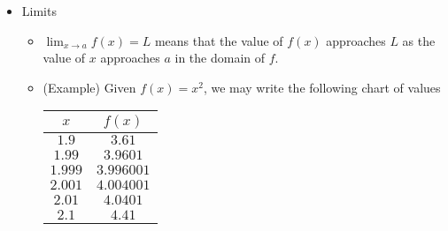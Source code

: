\documentclass[11pt]{article}
\begin{document}
\begin{itemize}
\item Limits
  \begin{itemize}
    \item \(\lim_{x\to a}f(x)=L\) means that the value of \(f(x)\) approaches
          \(L\) as the value of \(x\) approaches \(a\) in the domain of \(f\).
    \item (Example) Given \(f(x)=x^2\), we may write the following chart of
          values

      \begin{tabular}{c|c}
        \(x\) & \(f(x)\) \\\hline
        \(1.9\) & \(3.61\) \\
        \(1.99\) & \(3.9601\) \\
        \(1.999\) & \(3.996001\) \\
        \(2.001\) & \(4.004001\) \\
        \(2.01\) & \(4.0401\) \\
        \(2.1\) & \(4.41\)
      \end{tabular}


\end{itemize}
\end{itemize}
\end{document}
